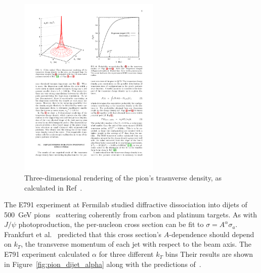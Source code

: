 \begin{figure}[!h]
    \centering
    \includegraphics[width=0.6\textwidth]{chap2/pion_charge_density.pdf}
    \caption{Three-dimensional rendering of the pion's trasnverse density, as
             calculated in Ref~\cite{Miller_2011}.
            }
    \label{fig:pion_charge_density}
\end{figure}


The E791 experiment at Fermilab studied diffractive dissociation into dijets of
\SI{500}{\giga\electronvolt} pions~\cite{Aitala_2001_1, Aitala_2001_2}
scattering coherently from carbon and platinum targets.
As with $J/\psi$ photoproduction, the per-nucleon cross section can be fit to
$\sigma = A^\alpha\sigma_a$.
Frankfurt et al.~\cite{Frankfurt_1993} predicted that this cross section's
$A$-dependence should depend on $k_T$, the transverse momentum of each jet with
respect to the beam axis.
The E791 experiment calculated $\alpha$ for three different $k_T$ bins
Their results are shown in Figure~\ref{fig:pion_dijet_alpha} along with the
predictions of~\cite{Frankfurt_1993}.

